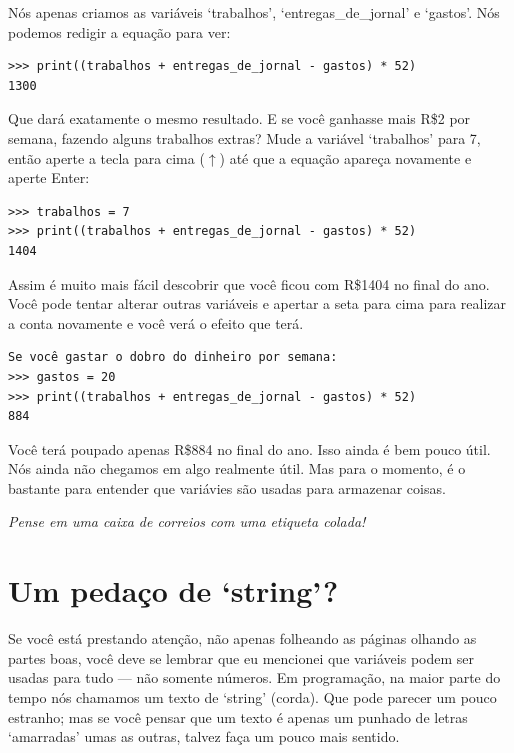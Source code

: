 \noindent
Nós apenas criamos as variáveis `trabalhos', `entregas\_de\_jornal' e `gastos'. Nós podemos redigir a equação para ver:

\begin{listing}
\begin{verbatim}
>>> print((trabalhos + entregas_de_jornal - gastos) * 52)
1300
\end{verbatim}
\end{listing}

Que dará exatamente o mesmo resultado. E se você ganhasse mais R\$2 por semana, fazendo alguns trabalhos extras? Mude a variável `trabalhos' para 7, então aperte a tecla para cima ($\uparrow$) até que a equação apareça novamente e aperte Enter:

\begin{listing}
\begin{verbatim}
>>> trabalhos = 7
>>> print((trabalhos + entregas_de_jornal - gastos) * 52)
1404
\end{verbatim}
\end{listing}

Assim é muito mais fácil descobrir que você ficou com R\$1404 no final do ano. Você pode tentar alterar outras variáveis e apertar a seta para cima para realizar a conta novamente e você verá o efeito que terá.

\begin{listing}
\begin{verbatim}
Se você gastar o dobro do dinheiro por semana:
>>> gastos = 20
>>> print((trabalhos + entregas_de_jornal - gastos) * 52)
884
\end{verbatim}
\end{listing}

Você terá poupado apenas R\$884 no final do ano. Isso ainda é bem pouco útil. Nós ainda não chegamos em algo realmente útil. Mas para o momento, é o bastante para entender que variávies são usadas para armazenar coisas.

\noindent
\emph{Pense em uma caixa de correios com uma etiqueta colada!}

\section{Um pedaço de `string'?}

Se você está prestando atenção, não apenas folheando as páginas olhando as partes boas, você deve se lembrar que eu mencionei que variáveis podem ser usadas para tudo --- não somente números. Em programação, na maior parte do tempo nós chamamos um texto de `string' (corda). Que pode parecer um pouco estranho; mas se você pensar que um texto é apenas um punhado de letras `amarradas' umas as outras, talvez faça um pouco mais sentido.


